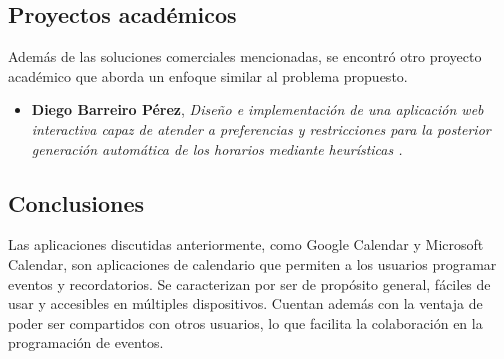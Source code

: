\subsection{Proyectos académicos}

Además de las soluciones comerciales mencionadas, se encontró otro proyecto académico que aborda un enfoque similar al problema propuesto.

\begin{itemize}
    \item \textbf{Diego Barreiro Pérez}, \textit{Diseño e implementación de una aplicación web interactiva capaz de atender a preferencias y restricciones para la posterior generación automática de los horarios mediante heurísticas \cite{Barreiro}.}
\end{itemize}





\subsection{Conclusiones}
Las aplicaciones discutidas anteriormente, como Google Calendar y Microsoft Calendar, son aplicaciones de calendario que permiten a los usuarios programar eventos y recordatorios. Se caracterizan por ser de propósito general, fáciles de usar y accesibles en múltiples dispositivos. Cuentan además con la ventaja de poder ser compartidos con otros usuarios, lo que facilita la colaboración en la programación de eventos.\newline

